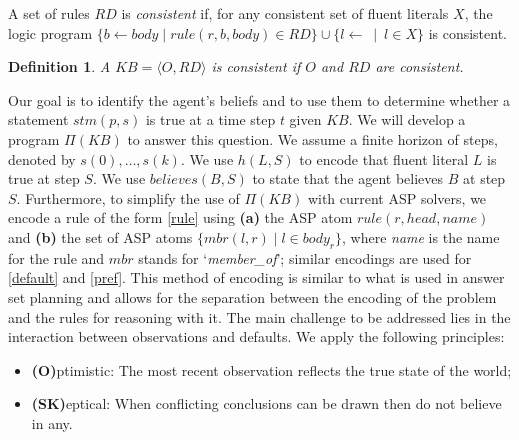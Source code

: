 \documentclass{article}
\newtheorem{definition}{Definition}
\begin{document}
A set of rules $RD$ is \emph{consistent} if, for any consistent set of fluent literals $X$, the logic program 
$\{b \leftarrow body  \mid rule(r, b, body) \in RD\} \cup \{l \leftarrow \:\mid\: l\in X\}$
is consistent.
%
\begin{definition}
A $KB = \langle O, RD \rangle$ is \emph{consistent} if $O$ and $RD$ are consistent. 
\end{definition} 
%
Our goal is to identify the agent's beliefs and to use them to determine whether  a statement $stm(p, s)$ is true at a time step $t$ given $KB$. We will develop a program $\Pi(KB)$ to answer this question. We assume a finite horizon of steps, denoted by $s(0), \ldots, s(k)$. We use $h(L,S)$ to encode that fluent literal $L$ is true at step $S$. We use $believes(B,S)$ to state that the agent believes $B$ at step $S$. Furthermore, to simplify the use of $\Pi(KB)$ with current ASP solvers, we  encode a rule of the form \eqref{rule}  using {\bf (a)} the ASP atom $rule(r, head, name)$ and
{\bf (b)} the set of ASP atoms $\{mbr(l, r) \mid l \in body_{r}\}$, where \textit{name} is the name for the rule and $mbr$ stands for `\textit{member\_of}'; similar encodings are used for  \eqref{default} and \eqref{pref}. 
This method of encoding is similar to what is used  in answer set planning and allows for the separation between  the encoding of the problem and the rules for reasoning with it.
The main challenge to be addressed lies in the interaction between observations and defaults. 
We apply the following principles:
%
\begin{itemize}
\item[]{\bf (O)}ptimistic: The most recent observation reflects the true state of the world;
\item[]{\bf (SK)}eptical: When conflicting conclusions can be drawn then do not believe in any.
\end{itemize}  

\end{document}

